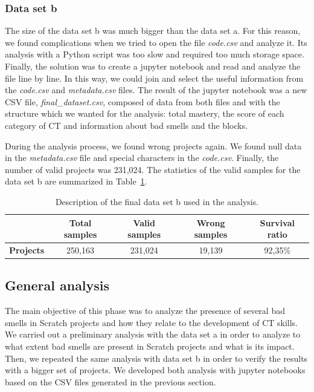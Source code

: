 \subsubsection{Data set b}
\label{subsubsec:datacollection_b}

The size of the data set b was much bigger than the data set a. For this reason, we found complications when we tried to open the file \textit{code.csv} and analyze it. Its analysis with a Python script was too slow and required too much storage space. Finally, the solution was to create a jupyter notebook and read and analyze the file line by line. In this way, we could join and select the useful information from the \textit{code.csv} and \textit{metadata.csv} files. The result of the jupyter notebook was a new CSV file, \textit{final\_dataset.csv}, composed of data from both files and with the structure which we wanted for the analysis: total mastery, the score of each category of CT and information about bad smells and the blocks. 

During the analysis process, we found wrong projects again. We found null data in the \textit{metadata.csv} file and special characters in the \textit{code.csv}. Finally, the number of valid projects was 231,024. The statistics of the valid samples for the data set b are summarized in Table~\ref{table:datacollection_b}.

\begin{table}
 \begin{center}
  \begin{tabular}{|c|c|c|c|c|}
    \hline
     & \textbf{Total samples} & \textbf{Valid samples} & \textbf{Wrong samples} & \textbf{Survival ratio} \\ \hline
    \textbf{Projects} & 250,163 & 231,024 & 19,139 & 92,35\% \\ \hline
  \end{tabular}
  \caption{Description of the final data set b used in the analysis.}
  \label{table:datacollection_b}
 \end{center}
\end{table}
    

\subsection{General analysis}
\label{subsec:generalanalysis}

The main objective of this phase was to analyze the presence of several bad smells in Scratch projects and how they relate to the development of CT skills. We carried out a preliminary analysis with the data set a in order to analyze to what extent bad smells are present in Scratch projects and what is its impact. Then, we repeated the same analysis with data set b in order to verify the results with a bigger set of projects. We developed both analysis with jupyter notebooks based on the CSV files generated in the previous section. 


